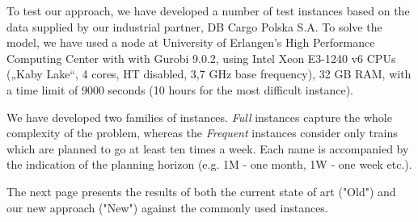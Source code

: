 To test our approach, we have developed a number of test instances based on the data supplied by our industrial partner, DB Cargo Polska S.A. To solve the model, we have used a node at University of Erlangen's High Performance Computing Center with with Gurobi 9.0.2, using Intel Xeon E3-1240 v6 CPUs („Kaby Lake“, 4 cores, HT disabled, 3,7 GHz base frequency), 32 GB RAM, with a time limit of 9000 seconds (10 hours for the most difficult instance).

We have developed two families of instances. \emph{Full} instances capture the whole complexity of the problem, whereas the \emph{Frequent} instances consider only trains which are planned to go at least ten times a week. Each name is accompanied by the indication of the planning horizon (e.g. 1M - one month, 1W - one week etc.).

The next page presents the results of both the current state of art ("Old") and our new approach ("New") against the commonly used instances.
\newpage
